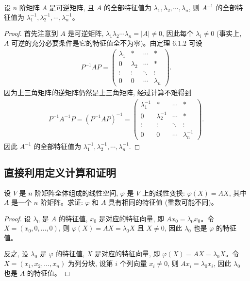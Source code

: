 \documentclass[lang=cn,newtx,10pt,scheme=chinese]{elegantbook}
\begin{document}
\begin{proposition}
设 $n$ 阶矩阵 $A$ 是可逆矩阵, 且 $A$ 的全部特征值为 $\lambda_1, \lambda_2, \cdots, \lambda_n$, 则 $A^{-1}$ 的全部特征值为 $\lambda_1^{-1}, \lambda_2^{-1}, \cdots, \lambda_n^{-1}$。
\end{proposition}
\begin{proof}
首先注意到 $A$ 是可逆矩阵, $\lambda_1 \lambda_2 \cdots \lambda_n = |A| \neq 0$, 因此每个 $\lambda_i \neq 0$ (事实上, $A$ 可逆的充分必要条件是它的特征值全不为零)。由定理 6.1.2 可设
\begin{align*}
P^{-1}AP = \begin{pmatrix}
\lambda_1 & * & \cdots & * \\
0 & \lambda_2 & \cdots & * \\
\vdots & \vdots & \ddots & \vdots \\
0 & 0 & \cdots & \lambda_n
\end{pmatrix}.
\end{align*}
因为上三角矩阵的逆矩阵仍然是上三角矩阵, 经过计算不难得到
\begin{align*}
P^{-1}A^{-1}P = (P^{-1}AP)^{-1} 
= \begin{pmatrix}
\lambda_1^{-1} & * & \cdots & * \\
0 & \lambda_2^{-1} & \cdots & * \\
\vdots & \vdots & \ddots & \vdots \\
0 & 0 & \cdots & \lambda_n^{-1}
\end{pmatrix}.
\end{align*}
因此 $A^{-1}$ 的全部特征值为 $\lambda_1^{-1}, \lambda_2^{-1}, \cdots, \lambda_n^{-1}$.
\end{proof}

\subsection{直接利用定义计算和证明}

\begin{example}
设 $V$ 是 $n$ 阶矩阵全体组成的线性空间, $\varphi$ 是 $V$ 上的线性变换: $\varphi(X) = AX$, 其中 $A$ 是一个 $n$ 阶矩阵。求证: $\varphi$ 和 $A$ 具有相同的特征值 (重数可能不同)。
\end{example}
\begin{proof}
设 $\lambda_0$ 是 $A$ 的特征值, $x_0$ 是对应的特征向量, 即 $Ax_0 = \lambda_0 x_0$。令 $X = (x_0, 0, \ldots, 0)$, 则 $\varphi(X) = AX = \lambda_0 X$ 且 $X \neq 0$, 因此 $\lambda_0$ 也是 $\varphi$ 的特征值。

反之, 设 $\lambda_0$ 是 $\varphi$ 的特征值, $X$ 是对应的特征向量, 即 $\varphi(X) = AX = \lambda_0 X$。令 $X = (x_1, x_2, \ldots, x_n)$ 为列分块, 设第 $i$ 个列向量 $x_i \neq 0$, 则 $Ax_i = \lambda_0 x_i$, 因此 $\lambda_0$ 也是 $A$ 的特征值。    
\end{proof}
\end{document}
